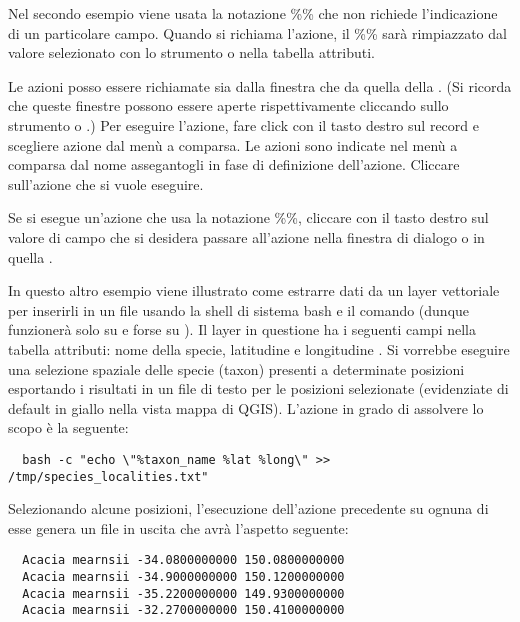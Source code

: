 Nel secondo esempio viene usata la notazione \%\% che non richiede
l'indicazione di un particolare campo. Quando si richiama l'azione, il \%\%
sarà rimpiazzato dal valore selezionato con lo strumento  o nella tabella attributi.

\label{label_usingactions}
Le azioni posso essere richiamate sia dalla finestra  che da quella della . 
(Si ricorda che queste finestre possono essere aperte rispettivamente cliccando sullo
strumento  o
.)
Per eseguire l'azione, fare click con il tasto destro sul record e scegliere
azione dal menù a comparsa. Le azioni sono indicate nel menù a comparsa dal
nome assegantogli in fase di definizione dell'azione. Cliccare sull'azione che
si vuole eseguire.

Se si esegue un'azione che usa la notazione \%\%, cliccare con il tasto destro
sul valore di campo che si desidera passare all'azione nella finestra di dialogo  o in quella .

In questo altro esempio viene illustrato come estrarre dati da un layer
vettoriale per inserirli in un file usando la shell di sistema bash e il
comando  (dunque funzionerà solo su \nix e forse su \osx). Il
layer in questione ha i seguenti campi nella tabella attributi: nome della
specie, latitudine  e longitudine
. Si vorrebbe eseguire una selezione spaziale delle specie
(taxon) presenti a determinate posizioni esportando i risultati in un file di
testo per le posizioni selezionate (evidenziate di default in giallo nella
vista mappa di QGIS). L'azione in grado di assolvere lo scopo è la seguente:

\begin{verbatim}
  bash -c "echo \"%taxon_name %lat %long\" >> /tmp/species_localities.txt"
\end{verbatim} 

Selezionando alcune posizioni, l'esecuzione dell'azione precedente su ognuna
di esse genera un file in uscita che avrà l'aspetto seguente:

\begin{verbatim}
  Acacia mearnsii -34.0800000000 150.0800000000
  Acacia mearnsii -34.9000000000 150.1200000000
  Acacia mearnsii -35.2200000000 149.9300000000
  Acacia mearnsii -32.2700000000 150.4100000000
\end{verbatim} 

